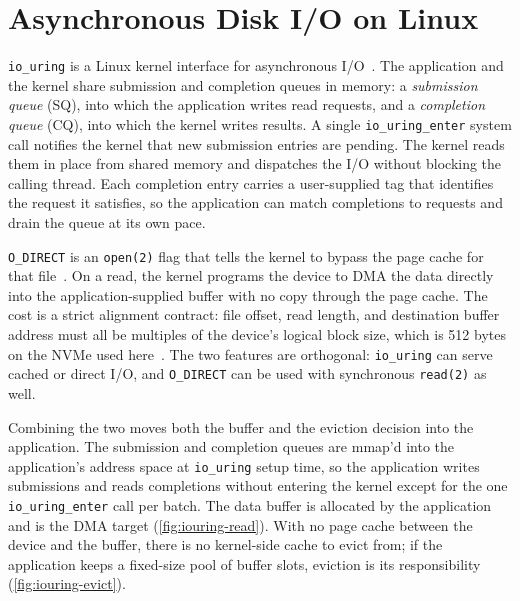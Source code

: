 \section{Asynchronous Disk I/O on Linux}\label{sec:bg-iouring}

\texttt{io\_uring} is a Linux kernel interface for asynchronous I/O~\cite{axboe2019iouring}.
The application and the kernel share submission and completion queues in memory: a \emph{submission queue} (SQ), into which the application writes read requests, and a \emph{completion queue} (CQ), into which the kernel writes results.
A single \texttt{io\_uring\_enter} system call notifies the kernel that new submission entries are pending. The kernel reads them in place from shared memory and dispatches the I/O without blocking the calling thread.
Each completion entry carries a user-supplied tag that identifies the request it satisfies, so the application can match completions to requests and drain the queue at its own pace.

\texttt{O\_DIRECT} is an \texttt{open(2)} flag that tells the kernel to bypass the page cache for that file~\cite{open_man}.
On a read, the kernel programs the device to DMA the data directly into the application-supplied buffer with no copy through the page cache.
The cost is a strict alignment contract: file offset, read length, and destination buffer address must all be multiples of the device's logical block size, which is 512 bytes on the NVMe used here~\cite{nvme_spec}.
The two features are orthogonal: \texttt{io\_uring} can serve cached or direct I/O, and \texttt{O\_DIRECT} can be used with synchronous \texttt{read(2)} as well.

Combining the two moves both the buffer and the eviction decision into the application.
The submission and completion queues are mmap'd into the application's address space at \texttt{io\_uring} setup time, so the application writes submissions and reads completions without entering the kernel except for the one \texttt{io\_uring\_enter} call per batch.
The data buffer is allocated by the application and is the DMA target (\autoref{fig:iouring-read}).
With no page cache between the device and the buffer, there is no kernel-side cache to evict from; if the application keeps a fixed-size pool of buffer slots, eviction is its responsibility (\autoref{fig:iouring-evict}).

